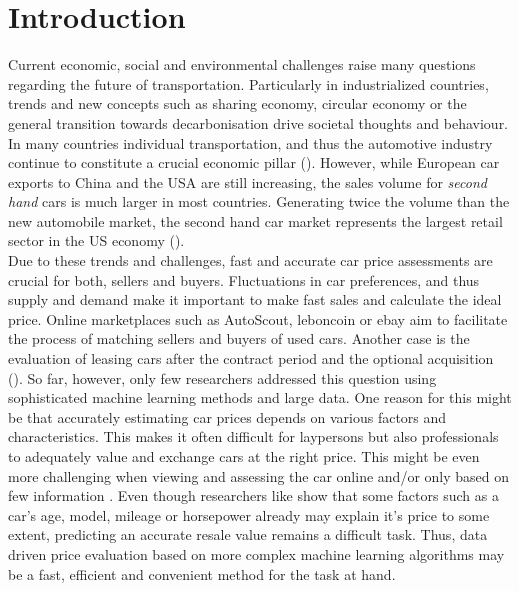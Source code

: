 \documentclass[12pt]{article}
\begin{document}
\renewcommand{\contentsname}{Table of contents}\tableofcontents

\newpage

\section{Introduction}
Current economic, social and environmental challenges raise many questions regarding the future of transportation. Particularly in industrialized countries, trends and new concepts such as sharing economy, circular economy or the general transition towards decarbonisation drive societal thoughts and behaviour. In many countries individual transportation, and thus the automotive industry continue to constitute a crucial economic pillar (\cite{huang2023dvmcar}). However, while European car exports to China and the USA are still increasing, the sales volume for \textit{second hand} cars is much larger in most countries. Generating twice the volume than the new automobile market, the second hand car market represents the largest retail sector in the US economy (\cite{Celik2019}). \\

\noindent Due to these trends and challenges, fast and accurate car price assessments are crucial for both, sellers and buyers. Fluctuations in car preferences, and thus supply and demand make it important to make fast sales and calculate the ideal price. Online marketplaces such as AutoScout, leboncoin or ebay aim to facilitate the process of matching sellers and buyers of used cars. Another case is the evaluation of leasing cars after the contract period and the optional acquisition (\cite{su142417034}). So far, however, only few researchers addressed this question using sophisticated machine learning methods and large data. One reason for this might be that accurately estimating car prices depends on various factors and characteristics. This makes it often difficult for laypersons but also professionals to adequately value and exchange cars at the right price. This might be even more challenging when viewing and assessing the car online and/or only based on few information \cite{Bilen2021}. Even though researchers like \cite{Pudaruth2014} show that some factors such as a car's age, model, mileage or horsepower already may explain it's price to some extent, predicting an accurate resale value remains a difficult task. Thus, data driven price evaluation based on more complex machine learning algorithms may be a fast, efficient and convenient method for the task at hand.\\
\end{document}
